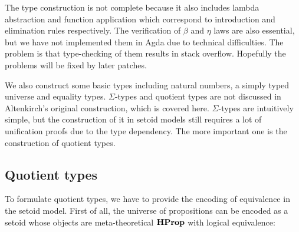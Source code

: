 The type construction is not complete because it also includes lambda abstraction and function application which correspond to introduction and elimination rules respectively. The verification of $\beta$ and $\eta$ laws are also essential, but we have not implemented them in Agda due to technical difficulties. The problem is that type-checking of them results in stack overflow. Hopefully the problems will be fixed by later patches.

We also construct some basic types including natural numbers, a simply typed universe and equality types. $\Sigma$-types and quotient types are not discussed in Altenkirch's original construction, which is covered here. $\Sigma$-types are intuitively simple, but the construction of it in setoid models still requires a lot of unification proofs due to the type dependency. The more important one is the construction of quotient types.


\subsection{Quotient types}

To formulate quotient types, we have to provide the encoding of equivalence in the setoid model. First of all, the universe of propositions can be encoded as a setoid whose objects are meta-theoretical $\textbf{HProp}$ with logical equivalence:

